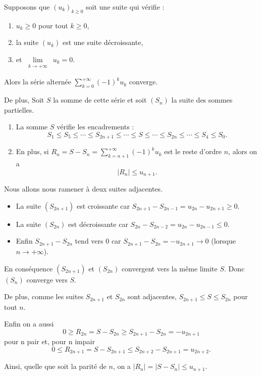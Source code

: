 \documentclass[french]{yLectureNote}
\newcommand{\Lim}[1]{\lim\limits_{\substack{#1}}\:}
\begin{document}
\begin{theorem}
Supposons que $(u_k)_{k\ge0}$ soit une suite qui vérifie :
\begin{enumerate}
  \item $u_k  \ge 0$ pour tout $k \ge 0$,
  \item la suite $(u_k)$ est une suite décroissante,
  \item et $\Lim{k\to+\infty} u_k=0$.
\end{enumerate}
Alors la série alternée $\displaystyle \sum_{k=0}^{+\infty} (-1)^k u_k$ converge.

De plus, Soit $S$ la somme de cette série et soit $(S_n)$ la suite des sommes partielles.
\begin{enumerate}
  \item La somme $S$ vérifie les encadrements :
  $$ S_1\le S_5\le \cdots \le S_{2n+1} \le \cdots \le S
  \le  \cdots\le S_{2n} \le \cdots\le S_4\le S_0.$$
  \item En plus, si $\displaystyle R_n=S-S_n =\sum_{k=n+1}^{+\infty} (-1)^k u_k$ est le reste d'ordre $n$, alors on  a
$$\big|R_n\big|\le u_{n+1}.$$
\end{enumerate}
\end{theorem}

\begin{myproof}
Nous allons nous ramener à deux suites adjacentes.
\begin{itemize}
  \item La suite $(S_{2n+1})$ est croissante car
  $S_{2n+1}-S_{2n-1}=u_{2n}-u_{2n+1}\ge 0$.

  \item La suite $(S_{2n})$ est décroissante car
  $S_{2n}-S_{2n-2}= u_{2n}-u_{2n-1}\le 0$.


  \item Enfin $S_{2n+1} - S_{2n}$ tend vers $0$
  car $S_{2n+1} - S_{2n} = -u_{2n+1} \to 0$
  (lorsque $n\to+\infty$).
\end{itemize}
En conséquence $(S_{2n+1})$ et $(S_{2n})$ convergent vers la même limite $S$.
Donc $(S_n)$ converge vers $S$.
\bigskip

De plus, comme les suites \(S_{2n+1}\) et \(S_{2n}\) sont adjacentes,  $S_{2n+1} \le S \le S_{2n}$ pour tout $n$.

Enfin on a aussi
 $$0\ge R_{2n}= S-S_{2n} \ge S_{2n+1}-S_{2n}=-u_{2n+1}$$ pour n pair et, pour n impair
 $$0\le R_{2n+1}= S-S_{2n+1} \le  S_{2n+2} -S_{2n+1}= u_{2n+2}.$$

 Ainsi, quelle que soit la parité de $n$, on a
 $|R_n|=|S-S_n|\le  u_{n+1}$.
 \end{myproof}
\end{document}
